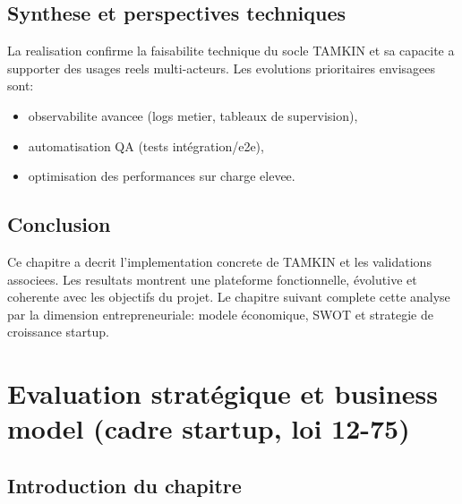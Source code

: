 \documentclass[12pt,a4paper,oneside]{report}
\begin{document}
\section{Synthese et perspectives techniques}

La realisation confirme la faisabilite technique du socle TAMKIN et sa capacite a supporter des usages reels multi-acteurs. Les evolutions prioritaires envisagees sont:
\begin{itemize}
  \item observabilite avancee (logs metier, tableaux de supervision),
  \item automatisation QA (tests intégration/e2e),
  \item optimisation des performances sur charge elevee.
\end{itemize}

\section{Conclusion}

Ce chapitre a decrit l'implementation concrete de TAMKIN et les validations associees. Les resultats montrent une plateforme fonctionnelle, évolutive et coherente avec les objectifs du projet. Le chapitre suivant complete cette analyse par la dimension entrepreneuriale: modele économique, SWOT et strategie de croissance startup.


\chapter{Evaluation stratégique et business model (cadre startup, loi 12-75)}

\section{Introduction du chapitre}
\end{document}
